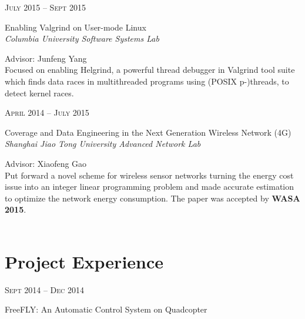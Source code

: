 \documentclass[10pt]{article} %
\begin{document}
{\begin{minipage}[t]{0.5\textwidth}
{\raggedleft\textsc{July 2015 -- Sept 2015}\par}

{\raggedright\large Enabling Valgrind on User-mode Linux\\
\textit{{\color{stress}Columbia University} Software Systems Lab}\\[5pt]}
Advisor: Junfeng Yang\\
\normalsize{Focused on enabling Helgrind, a powerful thread debugger in Valgrind tool suite which finds data races in multithreaded programs using (POSIX p-)threads, to detect kernel races.}\\


{\raggedleft\textsc{April 2014 -- July 2015}\par}

{\raggedright\large Coverage and Data Engineering in the Next Generation Wireless Network (4G)\\
\textit{{\color{stress}Shanghai Jiao Tong University} Advanced Network Lab}\\[5pt]}
Advisor: Xiaofeng Gao\\
\normalsize{Put forward a novel scheme for wireless sensor networks turning the energy cost issue into an integer linear programming problem and made accurate estimation to optimize the network energy consumption. The paper was accepted by \textbf{WASA 2015}.}\\ \\


\section{Project Experience} 


{\raggedleft\textsc{Sept 2014 -- Dec 2014}\par}

{\raggedright\large FreeFLY:  An Automatic Control System on Quadcopter\\
[5pt]}


\end{minipage}}
\end{document}
